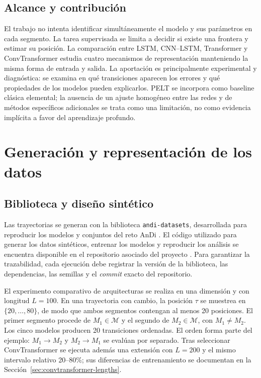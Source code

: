 \documentclass[a4paper,12pt]{article}
\newcommand{\Mset}{\mathcal{M}}
\begin{document}
\subsection{Alcance y contribución}

El trabajo no intenta identificar simultáneamente el modelo y sus parámetros en cada segmento. La tarea supervisada se limita a decidir si existe una frontera y estimar su posición. La comparación entre LSTM, CNN--LSTM, Transformer y ConvTransformer estudia cuatro mecanismos de representación manteniendo la misma forma de entrada y salida. La aportación es principalmente experimental y diagnóstica: se examina en qué transiciones aparecen los errores y qué propiedades de los modelos pueden explicarlos. PELT se incorpora como baseline clásica elemental; la ausencia de un ajuste homogéneo entre las redes y de métodos específicos adicionales se trata como una limitación, no como evidencia implícita a favor del aprendizaje profundo.

\section{Generación y representación de los datos}

\subsection{Biblioteca y diseño sintético}

Las trayectorias se generan con la biblioteca \texttt{andi-datasets}, desarrollada para reproducir los modelos y conjuntos del reto AnDi \cite{andidatasets2021}. El código utilizado para generar los datos sintéticos, entrenar los modelos y reproducir los análisis se encuentra disponible en el repositorio asociado del proyecto \cite{chair2026repo}. Para garantizar la trazabilidad, cada ejecución debe registrar la versión de la biblioteca, las dependencias, las semillas y el \emph{commit} exacto del repositorio.

El experimento comparativo de arquitecturas se realiza en una dimensión y con longitud $L=100$. En una trayectoria con cambio, la posición $\tau$ se muestrea en $\{20,\ldots,80\}$, de modo que ambos segmentos contengan al menos 20 posiciones. El primer segmento procede de $M_1\in\Mset$ y el segundo de $M_2\in\Mset$, con $M_1\neq M_2$. Los cinco modelos producen 20 transiciones ordenadas. El orden forma parte del ejemplo: $M_1\to M_2$ y $M_2\to M_1$ se evalúan por separado. Tras seleccionar ConvTransformer se ejecuta además una extensión con $L=200$ y el mismo intervalo relativo 20--80\%; sus diferencias de entrenamiento se documentan en la Sección~\ref{sec:convtransformer-lengths}.
\end{document}
